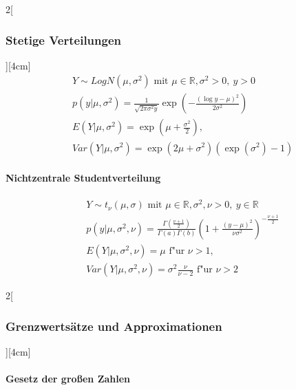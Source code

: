 \documentclass[8pt]{extarticle}
\begin{document}
\begin{multicols}{2}[\subsubsection{Stetige Verteilungen}][4cm]
    \begin{align*}
    & Y \sim LogN(\mu, \sigma^2) \text{ mit } \mu \in \mathbb{R}, \sigma^2 > 0,\: y > 0 \\
    & p(y|\mu, \sigma^2) =\frac{1}{\sqrt{2\pi\sigma^2 y}} \exp \left(-\frac{(\log y-\mu)^2}{2 \sigma^2} \right) \\
    & E(Y|\mu, \sigma^2) = \exp (\mu + \frac{\sigma^2}{2}) ,\\
    & Var(Y|\mu, \sigma^2) = \exp (2\mu + \sigma^2)(\exp (\sigma^2) - 1)
  \end{align*}
  
    \paragraph{Nichtzentrale Studentverteilung}
  
    \begin{align*}
    & Y \sim t_\nu(\mu, \sigma) \text{ mit } \mu \in \mathbb{R}, \sigma^2, \nu > 0,\: y \in \mathbb{R}\\
    & p(y|\mu, \sigma^2, \nu) =\frac{\Gamma \left( \frac{\nu + 1}{2}\right) }{\Gamma (a) \Gamma (b)} \left(1+ \frac{(y-\mu)^2}{\nu \sigma^2} \right)^{-\frac{\nu + 1}{2}} \\
    & E(Y|\mu, \sigma^2, \nu) = \mu \text{ f"ur }  \nu > 1,\\
    & Var(Y|\mu, \sigma^2, \nu) = \sigma^2 \frac{\nu}{\nu-2} \text{ f"ur }  \nu > 2
  \end{align*}

\end{multicols}

\begin{multicols}{2}[\subsubsection{Grenzwertsätze und Approximationen}][4cm]

  \paragraph{Gesetz der großen Zahlen}
  


\end{multicols}


  

\end{document}
